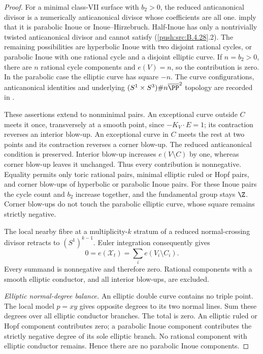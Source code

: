 \begin{proof}
For a minimal class-VII surface with $b_2>0$, the
reduced anticanonical divisor is a numerically
anticanonical divisor whose coefficients are all one.
\citet[Corollary 2.25, Lemma 2.26 and Proposition
2.27]{Dloussky2005AB} imply that it is parabolic Inoue
or Inoue--Hirzebruch. Half-Inoue has only a nontrivially
twisted anticanonical divisor and cannot satisfy
(\ref{push:src:B.4.28}.2). The remaining possibilities are hyperbolic
Inoue with two disjoint rational cycles, or parabolic
Inoue with one rational cycle and a disjoint elliptic
curve. If $n=b_2>0$, there are $n$ rational cycle
components and $e(V)=n$, so the contribution is zero.
In the parabolic case the elliptic curve has square
$-n$. The curve configurations, anticanonical identities
and underlying $(S^1\times S^3)\#n\overline{\PP}^2$
topology are recorded in
\citet[Sections 3.2--3.3]{FujikiPontecorvo2010AB}.

These assertions extend to nonminimal pairs. An
exceptional curve outside $C$ meets it once, transversely
at a smooth point, since $-K_V\cdot E=1$; its contraction
reverses an interior blow-up. An exceptional curve in
$C$ meets the rest at two points and its contraction
reverses a corner blow-up. The reduced anticanonical
condition is preserved. Interior blow-up increases
$e(V\setminus C)$ by one, whereas corner blow-up leaves
it unchanged. Thus every contribution is nonnegative.
Equality permits only toric rational pairs, minimal
elliptic ruled or Hopf pairs, and corner blow-ups of
hyperbolic or parabolic Inoue pairs. For these Inoue
pairs the cycle count and $b_2$ increase together, and
the fundamental group stays $\Z$. Corner blow-ups do
not touch the parabolic elliptic curve, whose square
remains strictly negative.

The local nearby fibre at a multiplicity-$k$ stratum
of a reduced normal-crossing divisor retracts to
$(S^1)^{k-1}$. Euler integration consequently gives
\[
 0=e(\mathcal X_t)=\sum_i e(V_i\setminus C_i).          \tag{B.4.28.4}
\]
Every summand is nonnegative and therefore zero.
Rational components with a smooth elliptic conductor,
and all interior blow-ups, are excluded.

\emph{Elliptic normal-degree balance.}
An elliptic double curve contains no triple point.
The local model $p=xy$ gives opposite degrees to its
two normal lines. Sum these degrees over all elliptic
conductor branches. The total is zero. An elliptic
ruled or Hopf component contributes zero; a parabolic
Inoue component contributes the strictly negative
degree of its sole elliptic branch. No rational
component with elliptic conductor remains. Hence there
are no parabolic Inoue components.


\end{proof}
